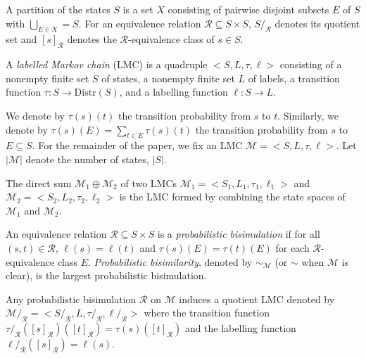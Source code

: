 \documentclass[a4paper,UKenglish,cleveref,autoref,thm-restate]{lipics-v2021}
\newcommand{\Dist}{\mathrm{Distr}}
\newcommand{\M}{\mathcal{M}}
\newcommand{\R}{\mathcal{R}}
\begin{document}
A partition of the states $S$ is a set $X$ consisting of pairwise disjoint subsets $E$ of $S$ with $\bigcup_{E \in X} = S$. For an equivalence relation $\R \subseteq S \times S$, $S /_{\R}$ denotes its quotient set and $[s]_\R$ denotes the $\R$-equivalence class of $s \in S$.

A \emph{labelled Markov chain} (LMC) is a quadruple $<S, L, \tau, \ell>$ consisting of a nonempty finite set $S$ of states, a nonempty finite set $L$ of labels, a transition function $\tau : S \to \Dist(S)$, and a labelling function $\ell: S \to L$.

We denote by $\tau(s)(t)$ the transition probability from $s$ to $t$. Similarly, we denote by $\tau(s)(E) = \sum_{t \in E} \tau(s)(t)$ the transition probability from $s$ to $E \subseteq S$.
For the remainder of the paper,  we fix an LMC $\M = <S,  L, \tau, \ell>$. Let $|\M|$ denote the number of states, $|S|$.

The direct sum $\M_1 \oplus \M_2$ of two LMCs $\M_1 = <S_1, L_1, \tau_1, \ell_1>$ and $\M_2 = <S_2, L_2, \tau_2, \ell_2>$ is the LMC formed by combining the state spaces of $\M_1$ and $\M_2$.

An equivalence relation $\R \subseteq S \times S$ is a \emph{probabilistic bisimulation} if for all $(s, t) \in \R$, $\ell(s) = \ell(t)$ and
$\tau(s)(E) = \tau(t)(E)$ for each $\R$-equivalence class $E$. \emph{Probabilistic bisimilarity}, denoted by $\mathord{\sim_{\M}}$ (or $\mathord{\sim}$ when $\M$ is clear), is the largest probabilistic bisimulation.

Any probabilistic bisimulation $\R$ on $\M$ induces a quotient LMC denoted by $\M/_{\R} = <S/_{\R}, L, \tau/_{\R}, \ell/_{\R}>$ where the transition function $\tau/_{\R}([s]_{\R})([t]_{\R}) = \tau(s)([t]_{\R})$ and the labelling function $\ell/_{\R}([s]_\R) = \ell(s)$.
\end{document}
